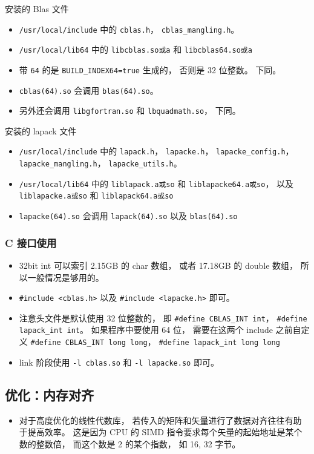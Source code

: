安装的 Blas 文件
\begin{itemize}
\item \verb|/usr/local/include| 中的 \verb|cblas.h|， \verb|cblas_mangling.h|。
\item \verb|/usr/local/lib64| 中的 \verb|libcblas.so或a| 和 \verb|libcblas64.so或a|
\item 带 \verb|64| 的是 \verb|BUILD_INDEX64=true| 生成的， 否则是 32 位整数。 下同。
\item \verb|cblas(64).so| 会调用 \verb|blas(64).so|。
\item 另外还会调用 \verb|libgfortran.so| 和 \verb|lbquadmath.so|， 下同。
\end{itemize}

安装的 lapack 文件
\begin{itemize}
\item \verb|/usr/local/include| 中的 \verb|lapack.h|， \verb|lapacke.h|， \verb|lapacke_config.h|， \verb|lapacke_mangling.h|， \verb|lapacke_utils.h|。
\item \verb|/usr/local/lib64| 中的 \verb|liblapack.a或so| 和 \verb|liblapacke64.a或so|， 以及 \verb|liblapacke.a或so| 和 \verb|liblapack64.a或so|
\item \verb|lapacke(64).so| 会调用 \verb|lapack(64).so| 以及 \verb|blas(64).so|
\end{itemize}

\subsubsection{C 接口使用}
\begin{itemize}
\item 32bit int 可以索引 2.15GB 的 char 数组， 或者 17.18GB 的 double 数组， 所以一般情况是够用的。
\item \verb|#include <cblas.h>| 以及 \verb|#include <lapacke.h>| 即可。
\item 注意头文件是默认使用 32 位整数的， 即 \verb|#define CBLAS_INT int|， \verb|#define lapack_int int|。 如果程序中要使用 64 位， 需要在这两个 include 之前自定义 \verb|#define CBLAS_INT long long|， \verb|#define lapack_int long long|
\item link 阶段使用 \verb|-l cblas.so| 和 \verb|-l lapacke.so| 即可。
\end{itemize}

\subsection{优化：内存对齐}
\begin{itemize}
\item 对于高度优化的线性代数库， 若传入的矩阵和矢量进行了数据对齐往往有助于提高效率。 这是因为 CPU 的 SIMD 指令要求每个矢量的起始地址是某个数的整数倍， 而这个数是 2 的某个指数， 如 16, 32 字节。
\end{itemize}
